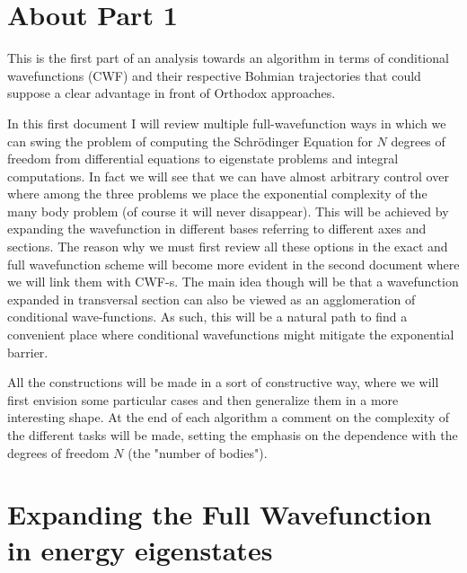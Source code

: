 \documentclass[11pt, a4paper]{article} %
\begin{document}
%
\section*{About Part 1}

This is the first part of an analysis towards an algorithm in terms of conditional wavefunctions (CWF) and their respective Bohmian trajectories that could suppose a clear advantage in front of Orthodox approaches.

In this first document I will review multiple full-wavefunction ways in which we can swing the problem of computing the Schrödinger Equation for $N$ degrees of freedom from differential equations to eigenstate problems and integral computations. In fact we will see that we can have almost arbitrary control over where among the three problems we place the exponential complexity of the many body problem (of course it will never disappear). This will be achieved by expanding the wavefunction in different bases referring to different axes and sections. The reason why we must first review all these options in the exact and full wavefunction scheme will become more evident in the second document where we will link them with CWF-s. The main idea though will be that a wavefunction expanded in transversal section can also be viewed as an agglomeration of conditional wave-functions. As such, this will be a natural path to find a convenient place where conditional wavefunctions might mitigate the exponential barrier.

All the constructions will be made in a sort of constructive way, where we will first envision some particular cases and then generalize them in a more interesting shape. At the end of each algorithm a comment on the complexity of the different tasks will be made, setting the emphasis on the dependence with the degrees of freedom $N$ (the "number of bodies").

\newpage
\section{Expanding the Full Wavefunction in energy eigenstates}
\end{document}
